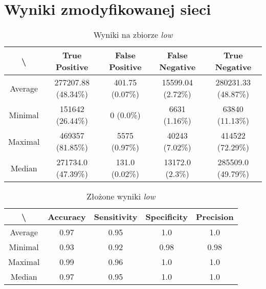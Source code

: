 \newpage
\section{Wyniki zmodyfikowanej sieci}
\label{sec:wyniki_zmodyfikowanej}

\begin{table}[!h]
	\centering
	\caption{Wyniki na zbiorze \textit{low}}
	\vspace{6pt}
	{\footnotesize
		\begin{tabular}{|c|c|c|c|c|}
			\hline \textbackslash & True Positive & False Positive & False Negative & True Negative \\
      \hline Average & 277207.88 (48.34\%) & 401.75 (0.07\%) & 15599.04 (2.72\%) & 280231.33 (48.87\%) \\
      \hline Minimal & 151642 (26.44\%) & 0 (0.0\%) & 6631 (1.16\%) & 63840 (11.13\%) \\
      \hline Maximal & 469357 (81.85\%) & 5575 (0.97\%) & 40243 (7.02\%) & 414522 (72.29\%) \\
      \hline Median & 271734.0 (47.39\%) & 131.0 (0.02\%) & 13172.0 (2.3\%) & 285509.0 (49.79\%) \\
      \hline
		\end{tabular}
	}
	\vspace{0pt}
\end{table}

\vspace{1cm}

\begin{table}[!h]
	\centering
	\caption{Złożone wyniki \textit{low}}
	\vspace{6pt}
	{\footnotesize
		\begin{tabular}{|c|c|c|c|c|}
			\hline \textbackslash & Accuracy & Sensitivity & Specificity & Precision \\
      \hline Average & 0.97 & 0.95 & 1.0 & 1.0 \\
      \hline Minimal & 0.93 & 0.92 & 0.98 & 0.98 \\
      \hline Maximal & 0.99 & 0.96 & 1.0 & 1.0 \\
      \hline Median & 0.97 & 0.95 & 1.0 & 1.0 \\
      \hline
		\end{tabular}
	}
	\vspace{0pt}
\end{table}




